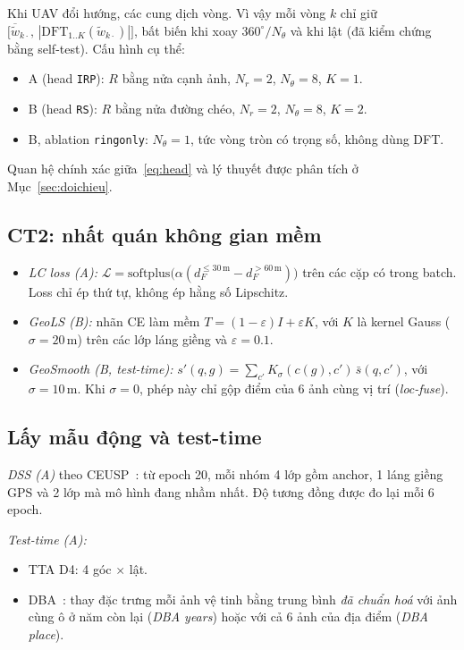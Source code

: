 \documentclass[11pt,a4paper]{article}
\newcommand{\run}[1]{\texttt{#1}}
\begin{document}
Khi UAV đổi hướng, các cung dịch vòng. Vì vậy mỗi vòng $k$ chỉ giữ $\big[\overline{\tilde w}_{k\cdot},\,|\mathrm{DFT}_{1..K}(\tilde w_{k\cdot})|\big]$, bất biến khi xoay $360^\circ/N_\theta$ và khi lật (đã kiểm chứng bằng self-test). Cấu hình cụ thể:
\begin{itemize}
\item A (head \run{IRP}): $R$ bằng nửa cạnh ảnh, $N_r=2$, $N_\theta=8$, $K=1$.
\item B (head \run{RS}): $R$ bằng nửa đường chéo, $N_r=2$, $N_\theta=8$, $K=2$.
\item B, ablation \run{ringonly}: $N_\theta=1$, tức vòng tròn có trọng số, không dùng DFT.
\end{itemize}
Quan hệ chính xác giữa~\eqref{eq:head} và lý thuyết được phân tích ở Mục~\ref{sec:doichieu}.

\subsection{CT2: nhất quán không gian mềm}
\begin{itemize}
\item \emph{LC loss (A):} $\mathcal L=\mathrm{softplus}\big(\alpha(d_F^{\le30\,\mathrm m}-d_F^{>60\,\mathrm m})\big)$ trên các cặp có trong batch. Loss chỉ ép thứ tự, không ép hằng số Lipschitz.
\item \emph{GeoLS (B):} nhãn CE làm mềm $T=(1-\varepsilon)I+\varepsilon K$, với $K$ là kernel Gauss ($\sigma=20$\,m) trên các lớp láng giềng và $\varepsilon=0.1$.
\item \emph{GeoSmooth (B, test-time):} $s'(q,g)=\sum_{c'}K_\sigma(c(g),c')\,\bar s(q,c')$, với $\sigma=10$\,m. Khi $\sigma=0$, phép này chỉ gộp điểm của 6 ảnh cùng vị trí (\emph{loc-fuse}).
\end{itemize}

\subsection{Lấy mẫu động và test-time}
\emph{DSS (A)} theo CEUSP~\cite{ceusp}: từ epoch 20, mỗi nhóm 4 lớp gồm anchor, 1 láng giềng GPS và 2 lớp mà mô hình đang nhầm nhất. Độ tương đồng được đo lại mỗi 6 epoch.

\emph{Test-time (A):}
\begin{itemize}
\item TTA D4: 4 góc $\times$ lật.
\item DBA~\cite{dba}: thay đặc trưng mỗi ảnh vệ tinh bằng trung bình \emph{đã chuẩn hoá} với ảnh cùng ô ở năm còn lại (\emph{DBA years}) hoặc với cả 6 ảnh của địa điểm (\emph{DBA place}).
\end{itemize}
\end{document}

